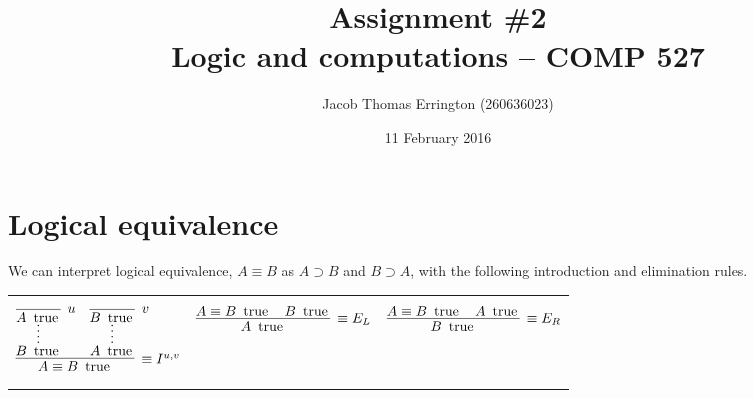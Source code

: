 \documentclass[11pt,letterpaper]{article}
\author{Jacob Thomas Errington (260636023)}
\title{Assignment \#2\\Logic and computations -- COMP 527}
\date{11 February 2016}
\DeclareMathOperator{\trueP}{\text{ true}}
\renewcommand{\t}{\trueP{}}
\begin{document}
\maketitle

\section{Logical equivalence}

We can interpret logical equivalence,
$A \equiv B$
as $A \supset B$ and $B \supset A$, with the following introduction and
elimination rules.

\begin{center}
    \begin{tabular}{c c c}
        $$
        \infer[\equiv I^{u,v}]{A \equiv B \t}{
            \infer*{B\t}{
                \infer[u]{A\t}{}
            }
            &
            \infer*{A\t}{
                \infer[v]{B\t}{}
            }
        }
        $$
        &
        $$
        \infer[\equiv E_L]{A\t}{
            A \equiv B \t
            &
            B \t
        }
        $$
        &
        $$
        \infer[\equiv E_R]{B\t}{
            A \equiv B \t
            &
            A \t
        }
        $$
    \end{tabular}
\end{center}
\end{document}
